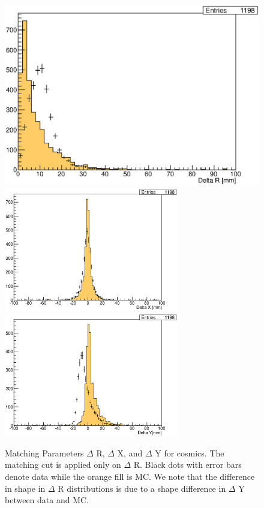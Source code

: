 \begin{figure}[h]
\centering
\includegraphics[width=5in]{Figures/Systematics/MatchingEfficiency/dRcosmics.eps}
\includegraphics[width=3in]{Figures/Systematics/MatchingEfficiency/dXcosmics.eps}
\includegraphics[width=3in]{Figures/Systematics/MatchingEfficiency/dYcosmics.eps} 
\caption{
Matching Parameters $\Delta$ R, $\Delta$ X, and $\Delta$ Y for cosmics. The matching cut is applied only on $\Delta$ R. Black dots with error bars denote data while the orange fill is MC. We note that the difference in shape in $\Delta$ R distributions is due to a shape difference in $\Delta$ Y between data and MC.
}
\label{fig:eff_dR}
\end{figure}

